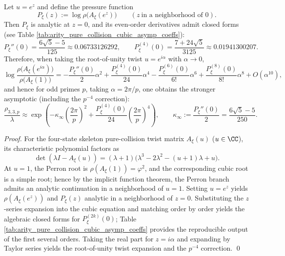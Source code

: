 \begin{proposition}\label{prop:arity-collision-quadratic-closed}
Let \(u=e^{z}\) and define the pressure function
$$
P_\xi(z):=\log\rho\bigl(A_\xi(e^{z})\bigr)\qquad(z\ \text{in a neighborhood of }0).
$$
Then \(P_\xi\) is analytic at \(z=0\), and its even-order derivatives admit closed forms (see Table \ref{tab:arity_pure_collision_cubic_asymp_coeffs}):
$$
P_\xi''(0)=\frac{6\sqrt5-5}{125}\approx 0.06733126292,
\qquad
P_\xi^{(4)}(0)=\frac{7+24\sqrt5}{3125}\approx 0.01941300207.
$$
Therefore, when taking the root-of-unity twist \(u=e^{i\alpha}\) with \(\alpha\to 0\),
$$
\log\frac{\rho\bigl(A_\xi(e^{i\alpha})\bigr)}{\rho\bigl(A_\xi(1)\bigr)}
=-\frac{P_\xi''(0)}{2}\alpha^2+\frac{P_\xi^{(4)}(0)}{24}\alpha^4-\frac{P_\xi^{(6)}(0)}{6!}\alpha^6+\frac{P_\xi^{(8)}(0)}{8!}\alpha^8+O(\alpha^{10}),
$$
and hence for odd primes \(p\), taking \(\alpha=2\pi/p\), one obtains the stronger asymptotic (including the \(p^{-4}\) correction):
$$
\frac{\rho_{3,3,p}}{\lambda}
\approx
\exp\!\left(
-\kappa_\infty\left(\frac{2\pi}{p}\right)^2+\frac{P_\xi^{(4)}(0)}{24}\left(\frac{2\pi}{p}\right)^4
\right),
\qquad
\kappa_\infty:=\frac{P_\xi''(0)}{2}=\frac{6\sqrt5-5}{250}.
$$
\end{proposition}

\begin{proof}
For the four-state skeleton pure-collision twist matrix \(A_\xi(u)\) (\(u\in\CC\)), its characteristic polynomial factors as
$$
\det(\lambda I-A_\xi(u))=(\lambda+1)\bigl(\lambda^3-2\lambda^2-(u+1)\lambda+u\bigr).
$$
At \(u=1\), the Perron root is \(\rho(A_\xi(1))=\varphi^2\), and the corresponding cubic root is a simple root; hence by the implicit function theorem, the Perron branch admits an analytic continuation in a neighborhood of \(u=1\).
Setting \(u=e^z\) yields \(\rho(A_\xi(e^z))\) and \(P_\xi(z)\) analytic in a neighborhood of \(z=0\).
Substituting the \(z\)-series expansion into the cubic equation and matching order by order yields the algebraic closed forms for \(P_\xi^{(2k)}(0)\); Table \ref{tab:arity_pure_collision_cubic_asymp_coeffs} provides the reproducible output of the first several orders.
Taking the real part for \(z=i\alpha\) and expanding by Taylor series yields the root-of-unity twist expansion and the \(p^{-4}\) correction. \qed
\end{proof}

